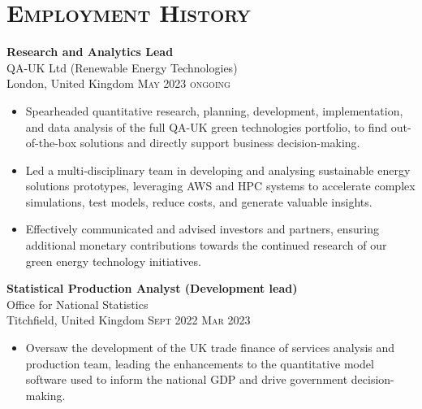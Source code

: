 \documentclass[oneside]{article}
\newcommand{\empitem}[7]{
        {\large \textbf{#1}} \\
        {{\fontseries{medium}\selectfont #2}}\\
        {{\fontseries{light}\selectfont #3}} \hfill
        {\scshape\fontseries{light}\selectfont\footnotesize #4 \textendash{} #5 #6} 
        #7
}
\begin{document}
{\begin{minipage}[t][\dimexpr\textheight-2\fboxrule-2\fboxsep\relax][t]{\dimexpr0.6\textwidth-2\fboxrule-2\fboxsep\relax}
        \section*{\scshape\Large Employment History \hrulefill}
%
        \empitem{Research and Analytics Lead}
        {QA-UK Ltd (Renewable Energy Technologies)}
        {London, United Kingdom}
        {May 2023}
        {ongoing}
        {}
        {
        \begin{itemize}
            \setlength{\itemsep}{-3pt}
            \item Spearheaded quantitative research, planning, development, implementation, and data analysis of the full QA-UK green technologies portfolio, to find out-of-the-box solutions and directly support business decision-making.
            \item Led a multi-disciplinary team in developing and analysing sustainable energy solutions prototypes, leveraging AWS and HPC systems to accelerate complex simulations, test models, reduce costs, and generate valuable insights.
            \item Effectively communicated and advised investors and partners, ensuring additional monetary contributions towards the continued research of our green energy technology initiatives. 
        \end{itemize}
        }
%
        \empitem {Statistical Production Analyst (Development lead)}
        {Office for National Statistics}
        {Titchfield, United Kingdom}
        {Sept 2022}
        {Mar 2023}
        {}
        {
        \begin{itemize}
            \setlength{\itemsep}{-3pt}
            \item Oversaw the development of the UK trade finance of services analysis and production team, leading the enhancements to the quantitative model software used to inform the national GDP and drive government decision-making.

\end{itemize}}
\end{minipage}}
\end{document}
